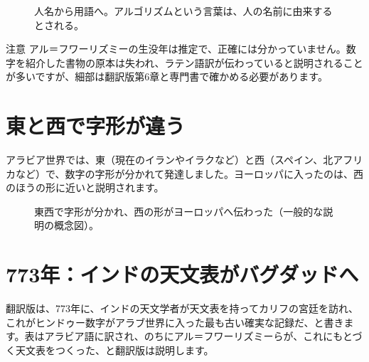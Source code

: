 \documentclass[a4paper,11pt,openany]{ltjsbook}
\begin{document}
\begin{figure}[htbp]
\centering
{}
\caption{人名から用語へ。アルゴリズムという言葉は、人の名前に由来するとされる。}
\end{figure}

\begin{notebox}{注意}
アル＝フワーリズミーの生没年は推定で、正確には分かっていません。数字を紹介した書物の原本は失われ、ラテン語訳が伝わっていると説明されることが多いですが、細部は翻訳版第6章と専門書で確かめる必要があります。
\end{notebox}

\section{東と西で字形が違う}

アラビア世界では、東（現在のイランやイラクなど）と西（スペイン、北アフリカなど）で、数字の字形が分かれて発達しました。ヨーロッパに入ったのは、西のほうの形に近いと説明されます。

\begin{figure}[htbp]
\centering
{}
\caption{東西で字形が分かれ、西の形がヨーロッパへ伝わった（一般的な説明の概念図）。}
\end{figure}

\section{773年：インドの天文表がバグダッドへ}

翻訳版は、773年に、インドの天文学者が天文表を持ってカリフの宮廷を訪れ、これがヒンドゥー数字がアラブ世界に入った最も古い確実な記録だ、と書きます。表はアラビア語に訳され、のちにアル＝フワーリズミーらが、これにもとづく天文表をつくった、と翻訳版は説明します。
\end{document}

